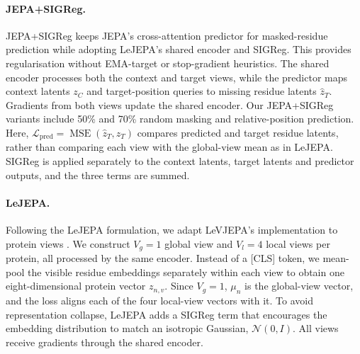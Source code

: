 \documentclass{article}
\begin{document}

\paragraph{JEPA+SIGReg.}
JEPA+SIGReg keeps JEPA's cross-attention predictor for masked-residue prediction while adopting LeJEPA's shared encoder and SIGReg. This provides regularisation without EMA-target or stop-gradient heuristics. The shared encoder processes both the context and target views, while the predictor maps context latents $z_C$ and target-position queries to missing residue latents $\hat z_T$. Gradients from both views update the shared encoder.
Our JEPA+SIGReg variants include 50\% and 70\% random masking and relative-position prediction.
Here, $\mathcal{L}_{\mathrm{pred}}=\operatorname{MSE}(\hat z_T,z_T)$ compares predicted and target residue latents, rather than comparing each view with the global-view mean as in LeJEPA. SIGReg is applied separately to the context latents, target latents and predictor outputs, and the three terms are summed.

\paragraph{LeJEPA.}
\label{sec:views}
Following the LeJEPA formulation, we adapt LeVJEPA's implementation to protein views \citep{kuhn2026levjepaefficientscalable}. We construct $V_g=1$ global view and $V_l=4$ local views per protein, all processed by the same encoder. Instead of a [CLS] token, we mean-pool the visible residue embeddings separately within each view to obtain one eight-dimensional protein vector $z_{n,v}$. Since $V_g=1$, $\mu_n$ is the global-view vector, and the loss aligns each of the four local-view vectors with it. To avoid representation collapse, LeJEPA adds a SIGReg term that encourages the embedding distribution to match an isotropic Gaussian, $\mathcal{N}(0,I)$. All views receive gradients through the shared encoder.
\end{document}

